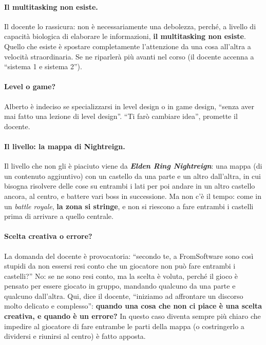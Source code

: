 \paragraph{Il multitasking non esiste.} Il docente lo rassicura: non è
necessariamente una debolezza, perché, a livello di capacità biologica di
elaborare le informazioni, \textbf{il multitasking non esiste}. Quello che
esiste è spostare completamente l'attenzione da una cosa all'altra a velocità
straordinaria. Se ne riparlerà più avanti nel corso (il docente accenna a
``sistema 1 e sistema 2'').

\paragraph{Level o game?} Alberto è indeciso se specializzarsi in level design
o in game design, ``senza aver mai fatto una lezione di level design''. ``Ti
farò cambiare idea'', promette il docente.

\paragraph{Il livello: la mappa di Nightreign.} Il livello che non gli è
piaciuto viene da \textbf{\emph{Elden Ring Nightreign}}: una mappa (di un
contenuto aggiuntivo) con un castello da una parte e un altro dall'altra, in
cui bisogna risolvere delle cose su entrambi i lati per poi andare in un
altro castello ancora, al centro, e battere vari boss in successione. Ma non
c'è il tempo: come in un \emph{battle royale}, \textbf{la zona si stringe}, e
non si riescono a fare entrambi i castelli prima di arrivare a quello
centrale.

\paragraph{Scelta creativa o errore?} La domanda del docente è
provocatoria: ``secondo te, a FromSoftware sono così stupidi da non essersi
resi conto che un giocatore non può fare entrambi i castelli?'' No: se ne sono
resi conto, ma la scelta è voluta, perché il gioco è pensato per essere
giocato in gruppo, mandando qualcuno da una parte e qualcuno dall'altra. Qui,
dice il docente, ``iniziamo ad affrontare un discorso molto delicato e
complesso'': \textbf{quando una cosa che non ci piace è una scelta creativa, e
quando è un errore?} In questo caso diventa sempre più chiaro che impedire al
giocatore di fare entrambe le parti della mappa (o costringerlo a dividersi e
riunirsi al centro) è fatto apposta.

